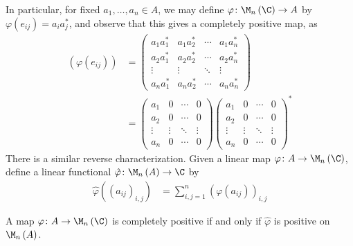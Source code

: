 \documentclass[10pt]{mypackage}
\begin{document}
In particular, for fixed $a_1,\dots,a_n\in A$, we may define $\varphi\colon \M_n\left( \C \right)\rightarrow A$ by $\varphi\left( e_{ij} \right) = a_ia_j^{\ast}$, and observe that this gives a completely positive map, as
\begin{align*}
  \left( \varphi\left( e_{ij} \right) \right) &= \begin{pmatrix}a_1a_1^{\ast} & a_1a_2^{\ast} & \cdots & a_1a_n^{\ast}\\a_2a_1^{\ast} & a_2a_2^{\ast} & \cdots & a_2a_n^{\ast} \\ \vdots & \vdots & \ddots & \vdots \\ a_na_1^{\ast} & a_na_2^{\ast} & \cdots & a_na_n^{\ast}\end{pmatrix}\\
                                              &= \begin{pmatrix}a_1 & 0 & \cdots & 0 \\ a_2 & 0 & \cdots & 0 \\ \vdots & \vdots & \ddots & \vdots \\ a_n & 0 & \cdots & 0\end{pmatrix} \begin{pmatrix}a_1 & 0 & \cdots & 0 \\ a_2 & 0 & \cdots & 0 \\ \vdots & \vdots & \ddots & \vdots \\ a_n & 0 & \cdots & 0\end{pmatrix}^{\ast}
\end{align*}
There is a similar reverse characterization. Given a linear map $\varphi\colon A\rightarrow \M_n\left( \C \right)$, define a linear functional $ \hat{\varphi}\colon \M_n\left( A \right)\rightarrow \C $ by
\begin{align*}
  \hat{\varphi}\left( \left( a_{ij} \right)_{i,j} \right) &= \sum_{i,j=1}^{n} \left( \varphi\left( a_{ij} \right) \right)_{i,j}
\end{align*}
\begin{proposition}
  A map $\varphi\colon A\rightarrow \M_n\left( \C \right)$ is completely positive if and only if $\hat{\varphi}$ is positive on $\M_n\left( A \right)$.
\end{proposition}
\end{document}
